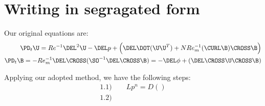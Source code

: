 \documentclass[11pt]{article}
\newcommand{\ReInv}{Re^{-1}}
\newcommand{\RemInv}{Re_m^{-1}}
\newcommand{\Al}{N Re_m^{-1}}
\begin{document}
\MOONSTITLE

\section{Writing in segragated form}
Our original equations are:
\begin{equation}\begin{aligned}
  \PD_t \U = \ReInv \DEL^2 \U - \DEL p + \left( \DEL \DOT (\U \U^T) + \Al (\CURL \B) \CROSS \B \right) \\
  \PD_t \B = -\RemInv \DEL \CROSS ( \SO^{-1} \DEL \CROSS \B ) = -\DEL \phi + \left( \DEL \CROSS \U \CROSS \B \right) \\
\end{aligned}\end{equation}

Applying our adopted method, we have the following steps:
\begin{equation}\begin{aligned}
  1.1) \qquad Lp^n = D() \\
  1.2) \qquad  \\
\end{aligned}\end{equation}
\end{document}
